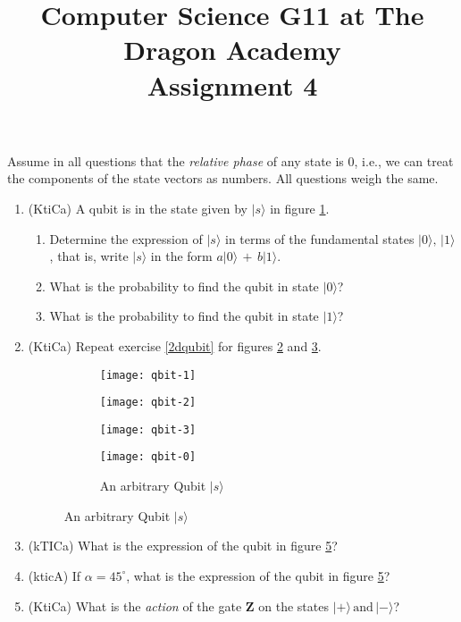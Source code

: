 \documentclass{article}
\title{
Computer Science G11 at The Dragon Academy\\
Assignment 4
}
\author{}
\begin{document}
\maketitle
Assume in all questions that the \textit{relative phase} of any state is $0$, i.e., we can treat the components of the state vectors as numbers. 
All questions weigh the same.
\begin{enumerate}
\item \label{2dqubit}(KtiCa) A qubit is in the state given by $|s\rangle$ in figure \ref{qbit-1}.
	\begin{enumerate}
	\item Determine the expression of $|s\rangle$ in terms of the fundamental states $|0\rangle,\,|1\rangle$, that is, write $|s\rangle$ in the form 
		$a|0\rangle\,+\,b|1\rangle$.
	\item What is the probability to find the qubit in state $|0\rangle$?
	\item What is the probability to find the qubit in state $|1\rangle$?
	\end{enumerate}
\item (KtiCa) Repeat exercise \ref{2dqubit} for figures \ref{qbit-2} and \ref{qbit-3}. %
\begin{figure}[h]
\centering
	\begin{subfigure}[h]{0.25\textwidth}
	\texttt{[image: qbit-1]}
	\caption{}
	\label{qbit-1}
	\end{subfigure}
	\begin{subfigure}[h]{0.25\textwidth}
	\texttt{[image: qbit-2]}
	\caption{}
	\label{qbit-2}
	\end{subfigure}
	\begin{subfigure}[h]{0.25\textwidth}
	\texttt{[image: qbit-3]}
	\caption{}
	\label{qbit-3}
	\end{subfigure}
	\begin{subfigure}[h]{0.25\textwidth}
	\texttt{[image: qbit-0]}
	\caption{An arbitrary Qubit $|s\rangle$}
	\label{qbit-0}
	\end{subfigure}
\end{figure}
\item (kTICa) What is the expression of the qubit in figure \ref{qbit-0}?
\item (kticA) If $\alpha=45^\circ$, what is the expression of the qubit in figure \ref{qbit-0}?
\item (KtiCa) What is the \textit{action} of the gate $\mathbf{Z}$ on the states $|+\rangle\,\mbox{and}\,|-\rangle$?

\end{enumerate}
\end{document}
